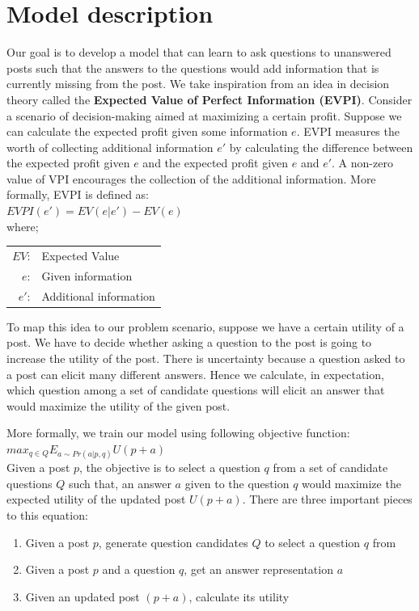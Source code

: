 \documentclass[11pt]{article}
\begin{document}
\section{Model description}\label{model}

Our goal is to develop a model that can learn to ask questions to unanswered posts such that the answers to the questions would add information that is currently missing from the post. We take inspiration from an idea in decision theory called the \textbf{Expected Value of Perfect Information (EVPI)}. Consider a scenario of decision-making aimed at maximizing a certain profit. Suppose we can calculate the expected profit given some information $e$. EVPI measures the worth of collecting additional information $e'$ by calculating the difference between the expected profit given $e$ and the expected profit given $e$ and $e'$. A non-zero value of VPI encourages the collection of the additional information. More formally, EVPI is defined as:\\

$EVPI(e') = EV(e| e') - EV(e)$ \\
where;
\begin{center}
\begin{tabular} {r  l}
$EV$: & Expected Value \\
$e$: & Given information \\
$e'$: & Additional information \\
\end{tabular}
\end{center}

To map this idea to our problem scenario, suppose we have a certain utility of a post. We have to decide whether asking a question to the post is going to increase the utility of the post. There is uncertainty because a question asked to a post can elicit many different answers. Hence we calculate, in expectation, which question among a set of candidate questions will elicit an answer that would maximize the utility of the given post. 

More formally, we train our model using following objective function:\\

$ max_{q \in Q}  E_{a \sim Pr(a|p,q)} U(p+a)$ \\

Given a post $p$, the objective is to select a question $q$ from a set of candidate questions $Q$ such that, an answer $a$ given to the question $q$ would maximize the expected utility of the updated post $U(p+a)$. There are three important pieces to this equation:
\begin{enumerate}
\item Given a post $p$, generate question candidates $Q$ to select a question $q$ from
\item Given a post $p$ and a question $q$, get an answer representation $a$
\item Given an updated post $(p+a)$, calculate its utility
\end{enumerate}
\end{document}
